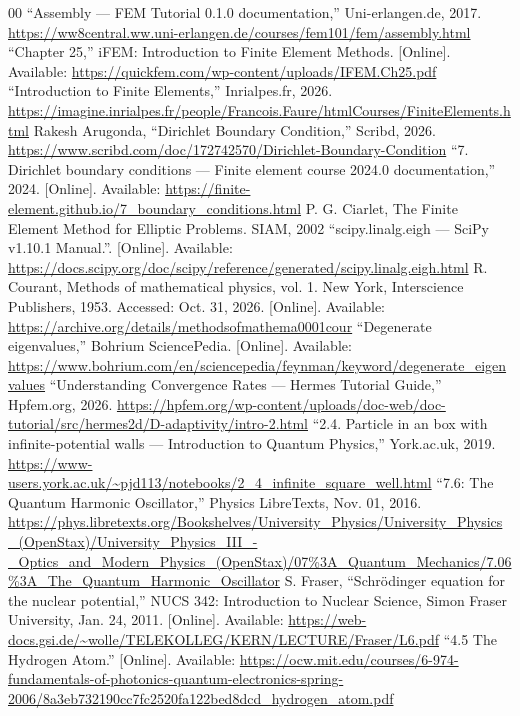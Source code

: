 \documentclass[conference]{IEEEtran}
\begin{document}
\begin{thebibliography}{00}
 “Assembly — FEM Tutorial 0.1.0 documentation,” Uni-erlangen.de, 2017. \url{https://ww8central.ww.uni-erlangen.de/courses/fem101/fem/assembly.html} 
 “Chapter 25,” iFEM: Introduction to Finite Element Methods. [Online]. Available: \url{https://quickfem.com/wp-content/uploads/IFEM.Ch25.pdf}
 “Introduction to Finite Elements,” Inrialpes.fr, 2026. \url{https://imagine.inrialpes.fr/people/Francois.Faure/htmlCourses/FiniteElements.html}
 Rakesh Arugonda, “Dirichlet Boundary Condition,” Scribd, 2026. \url{https://www.scribd.com/doc/172742570/Dirichlet-Boundary-Condition}
 “7. Dirichlet boundary conditions — Finite element course 2024.0 documentation,” 2024. [Online]. Available: \url{https://finite-element.github.io/7_boundary_conditions.html}
 P. G. Ciarlet, The Finite Element Method for Elliptic Problems. SIAM, 2002
 “scipy.linalg.eigh — SciPy v1.10.1 Manual.”. [Online]. Available: \url{https://docs.scipy.org/doc/scipy/reference/generated/scipy.linalg.eigh.html}
 R. Courant, Methods of mathematical physics, vol. 1. New York, Interscience Publishers, 1953. Accessed: Oct. 31, 2026. [Online]. Available: \url{https://archive.org/details/methodsofmathema0001cour}
 “Degenerate eigenvalues,” Bohrium SciencePedia. [Online]. Available: \url{https://www.bohrium.com/en/sciencepedia/feynman/keyword/degenerate_eigenvalues}
 “Understanding Convergence Rates — Hermes Tutorial Guide,” Hpfem.org, 2026. \url{https://hpfem.org/wp-content/uploads/doc-web/doc-tutorial/src/hermes2d/D-adaptivity/intro-2.html}
 “2.4. Particle in an box with infinite-potential walls — Introduction to Quantum Physics,” York.ac.uk, 2019. \url{https://www-users.york.ac.uk/~pjd113/notebooks/2_4_infinite_square_well.html}
 “7.6: The Quantum Harmonic Oscillator,” Physics LibreTexts, Nov. 01, 2016. \url{https://phys.libretexts.org/Bookshelves/University_Physics/University_Physics_(OpenStax)/University_Physics_III_-_Optics_and_Modern_Physics_(OpenStax)/07%3A_Quantum_Mechanics/7.06%3A_The_Quantum_Harmonic_Oscillator}
 S. Fraser, “Schrödinger equation for the nuclear potential,” NUCS 342: Introduction to Nuclear Science, Simon Fraser University, Jan. 24, 2011. [Online]. Available: \url{https://web-docs.gsi.de/~wolle/TELEKOLLEG/KERN/LECTURE/Fraser/L6.pdf}
 “4.5 The Hydrogen Atom.” [Online]. Available: \url{https://ocw.mit.edu/courses/6-974-fundamentals-of-photonics-quantum-electronics-spring-2006/8a3eb732190cc7fc2520fa122bed8dcd_hydrogen_atom.pdf}

\end{thebibliography}
\vspace{12pt}
\end{document}
